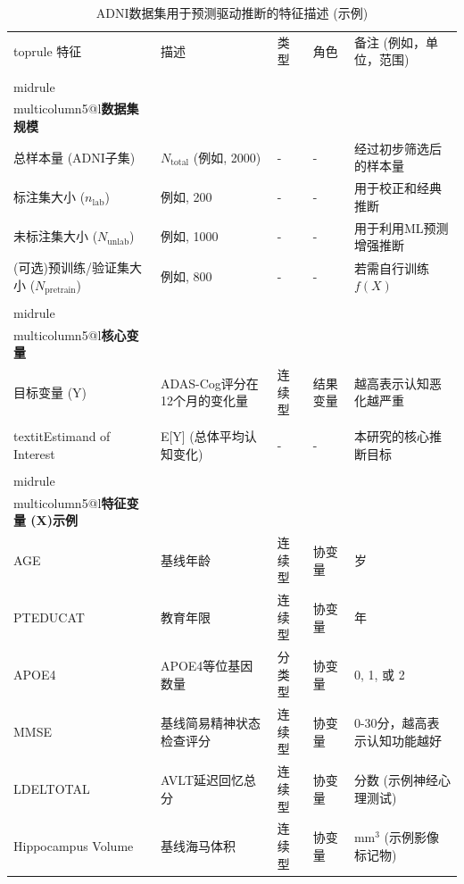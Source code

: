 \documentclass[12pt,a4paper]{article}
\begin{document}
\begin{table}[H]
    \centering
    \caption{ADNI数据集用于预测驱动推断的特征描述 (示例)}
    \label{tab:adni_features}
    \small %
    \begin{tabular}{@{}lllll@{}}
        \\toprule
        特征 & 描述 & 类型 & 角色 & 备注 (例如，单位，范围) \\
        \\midrule
        \\multicolumn{5}{@{}l}{\textbf{数据集规模}} \\
        总样本量 (ADNI子集) & $N_{\text{total}}$ (例如, 2000) & - & - & 经过初步筛选后的样本量 \\
        标注集大小 ($n_{\text{lab}}$) & 例如, 200 & - & - & 用于校正和经典推断 \\
        未标注集大小 ($N_{\text{unlab}}$) & 例如, 1000 & - & - & 用于利用ML预测增强推断 \\
        (可选)预训练/验证集大小 ($N_{\text{pretrain}}$) & 例如, 800 & - & - & 若需自行训练 $f(X)$ \\
        \\midrule
        \\multicolumn{5}{@{}l}{\textbf{核心变量}} \\
        目标变量 (Y) & ADAS-Cog评分在12个月的变化量 & 连续型 & 结果变量 & 越高表示认知恶化越严重 \\
        \\textit{Estimand of Interest} & E[Y] (总体平均认知变化) & - & - & 本研究的核心推断目标 \\
        \\midrule
        \\multicolumn{5}{@{}l}{\textbf{特征变量 (X)示例}} \\
        AGE & 基线年龄 & 连续型 & 协变量 & 岁 \\
        PTEDUCAT & 教育年限 & 连续型 & 协变量 & 年 \\
        APOE4 & APOE4等位基因数量 & 分类型 & 协变量 & 0, 1, 或 2 \\
        MMSE & 基线简易精神状态检查评分 & 连续型 & 协变量 & 0-30分，越高表示认知功能越好 \\
        LDELTOTAL & AVLT延迟回忆总分 & 连续型 & 协变量 & 分数 (示例神经心理测试) \\
        Hippocampus Volume & 基线海马体积 & 连续型 & 协变量 & mm$^3$ (示例影像标记物) \\

\end{tabular}
\end{table}
\end{document}
